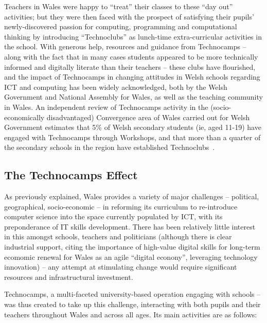 \documentclass{sig-alternate}
\begin{document}
Teachers in Wales were happy to ``treat'' their classes to these ``day
out'' activities; but they were then faced with the prospect of
satisfying their pupils' newly-discovered passion for computing,
programming and computational thinking by introducing ``Technoclubs''
as lunch-time extra-curricular activities in the school.  With
generous help, resources and guidance from Technocamps -- along with
the fact that in many cases students appeared to be more technically
informed and digitally literate than their teachers -- these clubs
have flourished, and the impact of Technocamps in changing attitudes
in Welsh schools regarding ICT and computing has been widely
acknowledged, both by the Welsh Government and National Assembly for
Wales, as well as the teaching community in Wales.  An independent
review of Technocamps activity in the (socio-economically
disadvantaged) Convergence area of Wales carried out for Welsh
Government estimates that 5\% of Welsh secondary students (ie, aged
11-19) have engaged with Technocamps through Workshops, and that more
than a quarter of the secondary schools in the region have established
Technoclubs~\cite{Wavehill:2015}.

\subsection{The Technocamps Effect}

As previously explained, Wales provides a variety of major challenges
-- political, geographical, socio-economic -- in reforming its
curriculum to re-introduce computer science into the space currently
populated by ICT, with its preponderance of IT skills
development. There has been relatively little interest in this amongst
schools, teachers and politicians (although there is clear industrial
support, citing the importance of high-value digital skills for
long-term ecomomic renewal for Wales as an agile ``digital econony'',
leveraging technology innovation) -- any attempt at stimulating change
would require significant resources and infrastructural investment.

Technocamps, a multi-faceted university-based operation engaging with
schools -- was thus created to take up this challenge, interacting
with both pupils and their teachers throughout Wales and across all
ages. Its main activities are as follows:
\end{document}

